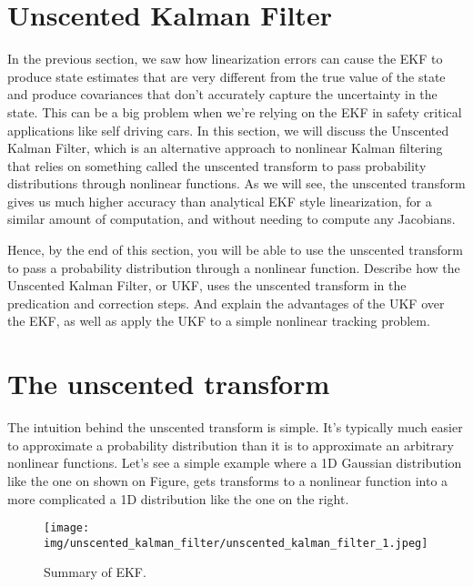 \section{Unscented Kalman Filter}
\label{unscented_kalman_filter}

In the previous section, we saw how linearization errors can cause the EKF to produce state estimates that are very different from
the true value of the state and produce covariances that don't accurately
capture the uncertainty in the state. This can be a big problem when we're relying on the EKF in safety critical applications
like self driving cars. In this section, we will discuss the Unscented Kalman
Filter, which is an alternative approach to nonlinear Kalman filtering that
relies on something called the unscented transform to pass probability
distributions through nonlinear functions. As we will see, the unscented transform
gives us much higher accuracy than analytical EKF style linearization,
for a similar amount of computation, and without needing to compute any Jacobians. 

Hence, by the end of this section, you will be able to use the unscented transform to pass a probability distribution
through a nonlinear function. Describe how the Unscented Kalman Filter, or UKF, uses the unscented transform in
the predication and correction steps. And explain the advantages
of the UKF over the EKF, as well as apply the UKF to a simple
nonlinear tracking problem. 

\section{The unscented transform}
\label{unscented_transform}

The intuition behind the unscented
transform is simple. It's typically much easier to approximate a probability distribution than it is to approximate an arbitrary
nonlinear functions. Let's see  a simple example where a 1D Gaussian distribution like the one on shown on Figure, gets transforms
to a nonlinear function into a more complicated a 1D distribution
like the one on the right. 

\begin{figure}[!htb]
\begin{center}
\texttt{[image: img/unscented\_kalman\_filter/unscented\_kalman\_filter\_1.jpeg]}
\end{center}
\caption{Summary of EKF.}
\label{unscented_kalman_filter_1}
\end{figure}

